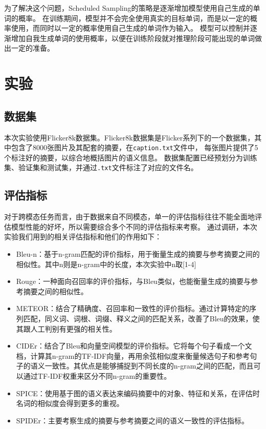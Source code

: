 \documentclass[]{ctexart}
\begin{document}
为了解决这个问题，Scheduled Sampling的策略是逐渐增加模型使用自己生成的单词的概率。
在训练期间，模型并不会完全使用真实的目标单词，而是以一定的概率使用，而同时以一定的概率使用自己生成的单词作为输入。
模型可以控制并逐渐增加自我生成单词的使用概率，以便在训练阶段就对推理阶段可能出现的单词做出一定的准备。

\section{实验}

\subsection{数据集}
本次实验使用Flicker8k数据集。Flicker8k数据集是Flicker系列下的一个数据集，其中包含了8000张图片及其配套的摘要，在\texttt{caption.txt}文件中，
每张图片提供了5个标注好的摘要，以综合地概括图片的语义信息。
数据集配置已经预划分为训练集、验证集和测试集，并通过\texttt{.txt}文件标注了对应的文件名。

\subsection{评估指标}
对于跨模态任务而言，由于数据来自不同模态，单一的评估指标往往不能全面地评估模型性能的好坏，所以需要综合多个不同的评估指标来考察。
通过调研，本次实验我们用到的相关评估指标和他们的作用如下：
\begin{itemize}
    \item Bleu-n：基于n-gram匹配的评价指标，用于衡量生成的摘要与参考摘要之间的相似性。其中n则是n-gram中的长度，本次实验中n取[1-4]
    \item Rouge：一种面向召回率的评价指标，与Bleu类似，也能衡量生成的摘要与参考摘要之间的相似性。
    \item METEOR：结合了精确度、召回率和一致性的评价指标。通过计算特定的序列匹配，同义词、词根、词缀、释义之间的匹配关系，改善了Bleu的效果，使其跟人工判别有更强的相关性。
    \item CIDEr：结合了Bleu和向量空间模型的评价指标。它将每个句子看成一个文档，计算其n-gram的TF-IDF向量，再用余弦相似度来衡量候选句子和参考句子的语义一致性。其优点是能够捕捉到不同长度的n-gram之间的匹配，而且可以通过TF-IDF权重来区分不同n-gram的重要性。
    \item SPICE：使用基于图的语义表达来编码摘要中的对象、特征和关系，在评估时名词的相似度会得到更多的重视。
    \item SPIDEr：主要考察生成的摘要与参考摘要之间的语义一致性的评估指标。
\end{itemize}
\end{document}
